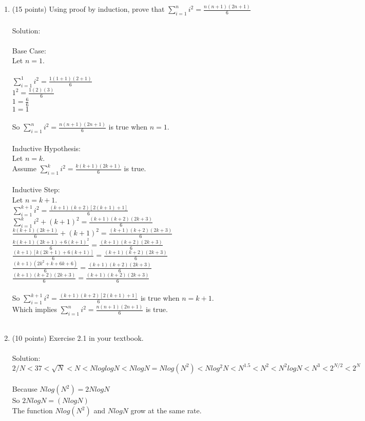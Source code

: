 \documentclass[12pt]{article}
\begin{document}
\begin{enumerate}
\item (15 points) Using proof by induction, prove that  $\sum_{i = 1}^{n}i^2 = \frac{n(n+1)(2n+1)}{6}$
\\\\Solution:
\\\\Base Case:
\\Let $n = 1$.
\\\\$\sum_{i=1}^{1}i^2 = \frac{1(1+1)(2+1)}{6}$
\\$1^2 = \frac{1(2)(3)}{6}$
\\$1 = \frac{6}{6}$
\\$1=1$
\\\\So $\sum_{i = 1}^{n}i^2 = \frac{n(n+1)(2n+1)}{6}$ is true when $n = 1$.
\\\\Inductive Hypothesis:
\\Let $n=k$.
\\Assume $\sum_{i=1}^{k}i^2 = \frac{k(k+1)(2k+1)}{6}$ is true.
\\\\Inductive Step:
\\Let $n = k+1$.
\\$\sum_{i=1}^{k+1}i^2 = \frac{(k+1)(k+2)[2(k+1)+1]}{6}$
\\$\sum_{i=1}^{k}i^2 +(k+1)^2 = \frac{(k+1)(k+2)(2k + 3)}{6}$
\\$ \frac{k(k+1)(2k+1)}{6} + (k+1)^2 = \frac{(k+1)(k+2)(2k + 3)}{6}$
\\$ \frac{k(k+1)(2k+1)+6(k+1)^2}{6} = \frac{(k+1)(k+2)(2k + 3)}{6}$
\\$ \frac{(k+1)[k(2k+1)+6(k+1)]}{6} = \frac{(k+1)(k+2)(2k + 3)}{6}$
\\$ \frac{(k+1)(2k^2+ k+6k+6)}{6} = \frac{(k+1)(k+2)(2k + 3)}{6}$
\\$\frac{(k+1)(k+2)(2k + 3)}{6} =\frac{(k+1)(k+2)(2k + 3)}{6}$
\\\\So $\sum_{i=1}^{k+1}i^2 = \frac{(k+1)(k+2)[2(k+1)+1]}{6}$ is true when $n=k+1$.
\\Which implies  $\sum_{i = 1}^{n}i^2 = \frac{n(n+1)(2n+1)}{6}$ is true.
\\\\

\item(10 points) Exercise 2.1 in your textbook. 
\\\\Solution:
\\$2/N <37< \sqrt{N} < N <N loglog N<NlogN = Nlog(N^2) <Nlog^2N< N^{1.5}<N^2<N^2logN<N^3<2^{N/2}<2^N$
\\\\ Because $Nlog(N^2) = 2NlogN$
\\ So $2NlogN =  (NlogN)$
\\The function $Nlog(N^2)$ and $NlogN$ grow at the same rate.
\\\\


\end{enumerate}
\end{document}
